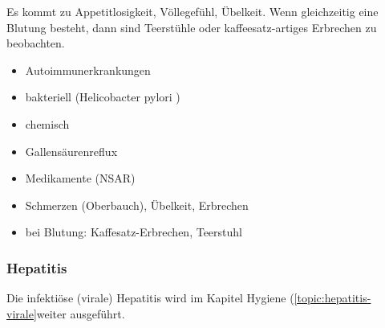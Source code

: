 

\gMarried
{

Es kommt zu Appetitlosigkeit, Völlegefühl, Übelkeit. Wenn
gleichzeitig eine Blutung besteht, dann sind Teerstühle
oder kaffeesatz-artiges Erbrechen zu beobachten.}
{
\begin{itemize}
\item Autoimmunerkrankungen
\item bakteriell (Helicobacter pylori )
\item chemisch
\item Gallensäurenreflux
\item Medikamente (NSAR)
\end{itemize}


\begin{itemize}
\item Schmerzen (Oberbauch), Übelkeit, Erbrechen
\item bei Blutung: Kaffesatz-Erbrechen,  Teerstuhl
\end{itemize}}





\subsubsection{Hepatitis}


Die infektiöse (virale) Hepatitis wird im Kapitel Hygiene
(\ref{topic:hepatitis-virale}weiter ausgeführt.

